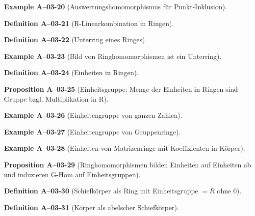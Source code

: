 \documentclass[10pt, letterpaper]{article}
\newcommand{\CustomHeading}[3]{%
  \par\medskip\noindent%
  \textbf{#1 #2} \textnormal{(#3)}.\enskip%
}
\newenvironment{DEF}[2]{\CustomHeading{Definition}{#1}{#2}}{}
\newenvironment{PROP}[2]{\CustomHeading{Proposition}{#1}{#2}}{}
\newenvironment{EXA}[2]{\CustomHeading{Example}{#1}{#2}}{}
\begin{document}
\begin{EXA}{A--03-20}{Auswertungshomomorphismus für Punkt-Inklusion}
\end{EXA}

\begin{DEF}{A--03-21}{R-Linearkombination in Ringen}
\end{DEF}

\begin{DEF}{A--03-22}{Unterring eines Ringes}
\end{DEF}

\begin{EXA}{A--03-23}{Bild von Ringhomomorphismen ist ein Unterring}
\end{EXA}

\begin{DEF}{A--03-24}{Einheiten in Ringen}
\end{DEF}

\begin{PROP}{A--03-25}{Einheitsgruppe: Menge der Einheiten in Ringen sind Gruppe bzgl. Multiplikation in R}
\end{PROP}

\begin{EXA}{A--03-26}{Einheitengruppe von ganzen Zahlen}
\end{EXA}

\begin{EXA}{A--03-27}{Einheitengruppe von Gruppenringe}
\end{EXA}

\begin{EXA}{A--03-28}{Einheiten von Matrizenringe mit Koeffizienten in Körper}
\end{EXA}

\begin{PROP}{A--03-29}{Ringhomomorphismen bilden Einheiten auf Einheiten ab und induzieren G-Hom auf Einheitsgruppen}
\end{PROP}

\begin{DEF}{A--03-30}{Schiefkörper als Ring mit Einheitsgruppe $= R$ ohne $0$}
\end{DEF}

\begin{DEF}{A--03-31}{Körper als abelscher Schiefkörper}
\end{DEF}
\end{document}
